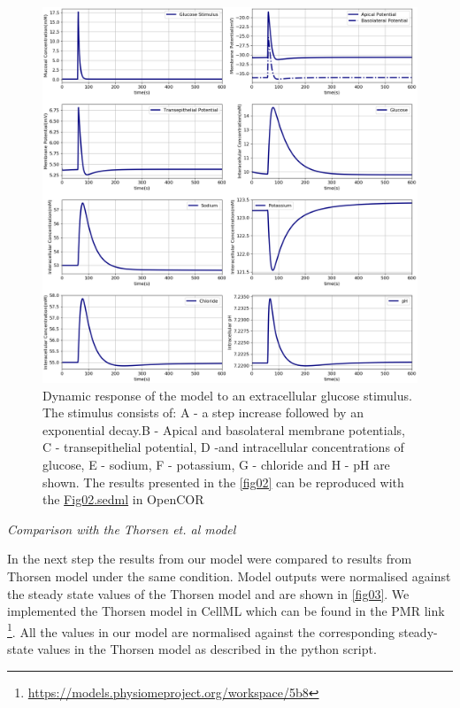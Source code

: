 \documentclass[fleqn,10pt]{physiome}
\begin{document}
\begin{figure}[ht]
\centering
\includegraphics[width=0.8\linewidth]{fig02.png}
\caption{Dynamic response of the model to an extracellular
glucose stimulus. The stimulus consists of: A - a step increase
followed by an exponential decay.B - Apical and basolateral
membrane potentials, C - transepithelial potential, D -and intracellular
concentrations of glucose, E - sodium, F - potassium, G - chloride and H - pH are shown. The results presented in the \autoref{fig02} can be reproduced with the \href{https://models.physiomeproject.org/workspace/572/file/59488c15178b09bcb5b11f795383b1435f7b7ef1/SEDML_files/Fig02.sedml}{Fig02.sedml} in OpenCOR}
\label{fig02}
\end{figure}

\textit{Comparison with the Thorsen et. al model \citep{thorsen2014transepithelial}}\newline

In the next step the results from our model were compared to results from Thorsen model under the same condition. Model outputs were normalised against the steady state values of the Thorsen model and are shown in \autoref{fig03}. We implemented the Thorsen model in CellML which can be found in the PMR link \footnote{\url{https://models.physiomeproject.org/workspace/5b8}}. All the values in our model are normalised against the corresponding steady-state values in the Thorsen model as described in the python script. \newpage
\end{document}
